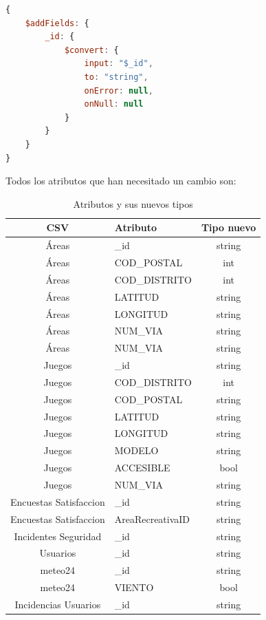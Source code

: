 \documentclass[]{article}
\begin{document}
\begin{lstlisting}[language=JavaScript, caption=Cambio de tipo genérico]
{
    $addFields: {
        _id: {
            $convert: {
                input: "$_id",
                to: "string",
                onError: null,
                onNull: null
            }
        }
    }
}
\end{lstlisting}

Todos los atributos que han necesitado un cambio son:

\begin{table}[H]
    \centering
    \begin{tabular}{| c | l | c |}
        \hline
        CSV & Atributo & Tipo nuevo \\ \hline 
        Áreas & \_id & string\\ 
        Áreas & COD\_POSTAL & int\\ 
        Áreas & COD\_DISTRITO & int\\ 
        Áreas & LATITUD & string\\ 
        Áreas & LONGITUD & string\\
        Áreas & NUM\_VIA & string\\ 
        Áreas & NUM\_VIA & string\\ 
        Juegos & \_id & string\\ 
        Juegos & COD\_DISTRITO & int\\ 
        Juegos & COD\_POSTAL & string\\ 
        Juegos & LATITUD & string\\ 
        Juegos & LONGITUD & string\\
        Juegos & MODELO & string\\ 
        Juegos & ACCESIBLE & bool\\ 
        Juegos & NUM\_VIA & string\\ 
        Encuestas Satisfaccion & \_id & string\\
        Encuestas Satisfaccion & AreaRecreativaID & string\\ 
        Incidentes Seguridad & \_id & string\\ 
        Usuarios & \_id & string\\ 
        meteo24 & \_id & string\\ 
        meteo24 & VIENTO & bool\\
        Incidencias Usuarios & \_id & string\\ 
        \hline
    \end{tabular}
    \caption{Atributos y sus nuevos tipos}
\end{table}
\end{document}
